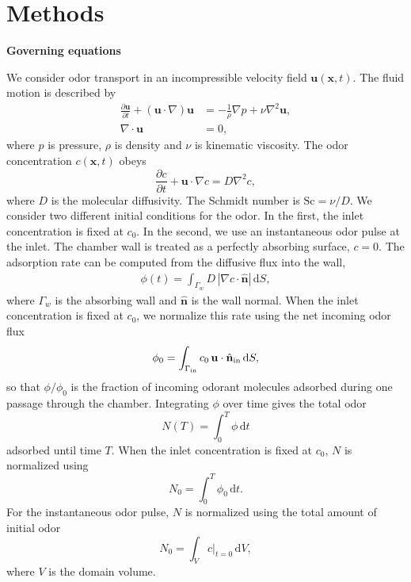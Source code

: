 \documentclass[%
 twocolumn,
 amsmath,amssymb,
 aps,prfluids,
 superscriptaddress,
]{revtex4-2}
\newcommand{\bs}[1]{\boldsymbol{#1}}
\newcommand{\Sc}{\mathrm{Sc}}
\newcommand{\diff}{\mathrm{d}}
\begin{document}
\setcounter{savesection}{\value{section}}

\appendix

\section{Methods}
\label{app:methods}

\noindent \textbf{Governing equations}

We consider odor transport in an incompressible velocity field $\bs{u}(\bs{x},t)$. The fluid motion is described by
\begin{align}
\frac{\partial \bs{u}}{\partial t}+\left(\bs{u}\cdot\nabla\right)\bs{u} &=-\frac{1}{\rho}\nabla p+\nu\nabla^2\bs{u},\label{eq:ns}\\
\nabla\cdot\bs{u} &=0, \nonumber
\end{align}
where $p$ is pressure, $\rho$ is density and $\nu$ is kinematic viscosity. The odor concentration $c(\mathbf{x},t)$ obeys
\begin{equation}
\frac{\partial c}{\partial t}+\bs{u}\cdot\nabla c=D\nabla^2 c,
\label{eq:advection_diffusion}
\end{equation}
where $D$ is the molecular diffusivity. The Schmidt number is $\Sc=\nu/D$. We consider two different initial conditions for the odor. In the first, the inlet concentration is fixed at $c_0$. In the second, we use an instantaneous odor pulse at the inlet. The chamber wall is treated as a perfectly absorbing surface, $c=0$. The adsorption rate can be computed from the diffusive flux into the wall,
\begin{align}
\phi(t)=\int_{\Gamma_w}D\,\left|\nabla c\cdot\hat{\mathbf{n}}\right|\,\diff S, 
\label{eq:wallflux}
\end{align}
where $\Gamma_w$ is the absorbing wall and $\hat{\mathbf{n}}$ is the wall normal. 
When the inlet concentration is fixed at $c_0$, we normalize this rate using the net incoming odor flux
\begin{equation}
\phi_0=\int_{\Gamma_{\rm in}}c_0\,\mathbf{u}\cdot\hat{\mathbf{n}}_{\rm in}\,\diff S,
\label{eq:incoming_flux}
\end{equation}
so that $\phi/\phi_0$ is the fraction of incoming odorant molecules adsorbed during one passage through the chamber. Integrating $\phi$ over time gives the total odor 
\begin{equation}
N(T)=\int_0^T\phi\,\diff t
\label{eq:odor_total}
\end{equation}
adsorbed until time $T$. When the inlet concentration is fixed at $c_0$, $N$ is normalized using 
\begin{equation}
N_0=\int_0^T\phi_0\,\diff t.
\label{eq:odor_total_initial}
\end{equation}
For the instantaneous odor pulse, $N$ is normalized using the total amount of initial odor 
\begin{equation}
N_0=\int_V \left.c\right|_{t=0}\,\diff V,
\end{equation}
where $V$ is the domain volume.
\end{document}

